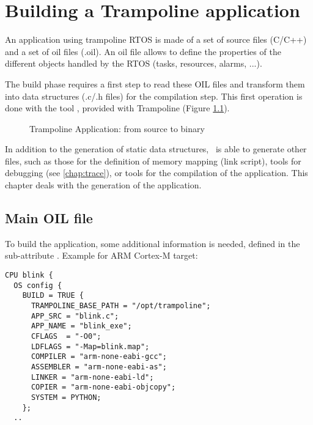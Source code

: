 
\chapter{Building a Trampoline application}

An application using trampoline RTOS is made of a set of source files (C/C++) and a set of oil files (.oil). An oil file allows to define the properties of the different objects handled by the RTOS (tasks, resources, alarms, ...).


The build phase requires a first step to read these OIL files and transform them into data structures (.c/.h files) for the compilation step. This first operation is done with the tool \goil, provided with Trampoline (Figure \ref{fig:filesbis}).

\begin{figure}[htbp]
    \centering
	\begin{adjustbox}{width=.7\linewidth,keepaspectratio}
		
	\end{adjustbox}
\caption{Trampoline Application: from source to binary}
	\label{fig:filesbis}
\end{figure}

In addition to the generation of static data structures, \goil\ is able to generate other files, such as those for the definition of memory mapping (link script), tools for debugging (see \ref{chap:trace}), or tools for the compilation of the application. This chapter deals with the generation of the application.

\section{Main OIL file}

To build the application, some additional information is needed, defined in the sub-attribute . Example for ARM Cortex-M target:

\lstset{language=OIL}
\begin{lstlisting}
CPU blink {
  OS config { 
    BUILD = TRUE {
      TRAMPOLINE_BASE_PATH = "/opt/trampoline";
      APP_SRC = "blink.c";
      APP_NAME = "blink_exe";
      CFLAGS  = "-O0";
      LDFLAGS = "-Map=blink.map";
      COMPILER = "arm-none-eabi-gcc";
      ASSEMBLER = "arm-none-eabi-as";
      LINKER = "arm-none-eabi-ld";
      COPIER = "arm-none-eabi-objcopy";
      SYSTEM = PYTHON;
    };
  ..
\end{lstlisting}

